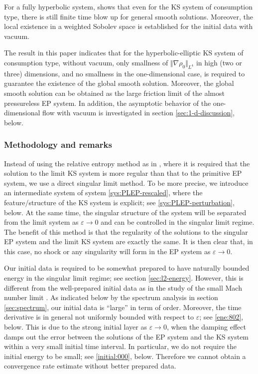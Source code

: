 \documentclass[11pt]{article}
\theoremstyle{plain}
\theoremstyle{definition}
\theoremstyle{remark}
\newcommand{\norm}[2]{\Vert #1 \Vert_{#2}}
\numberwithin{equation}{section}
\begin{document}
    For a fully hyperbolic system, \cite{jeongWellPosednessSingularityFormation2022} shows that even for the KS system of consumption type, there is still finite time blow up for general smooth solutions. Moreover, the local existence in a weighted Sobolev space is established for the initial data with vacuum. 

    The result in this paper indicates that for the hyperbolic-elliptic KS system of consumption type, without vacuum, only smallness of $ \norm{\nabla \rho_0}{L^4} $ in high (two or three) dimensions, and no smallness in the one-dimensional case, is required to guarantee the existence of the global smooth solution. Moreover, the global smooth solution can be obtained as the large friction limit of the almost pressureless EP system. In addition, the asymptotic behavior of the one-dimensional flow with vacuum is investigated in section \ref{sec:1-d-discussion}, below.




    \subsubsection*{Methodology and remarks}

    Instead of using the relative entropy method as in \cite{gallenmullerCahnHillardKeller2024}, where it is required that the solution to the limit KS system is more regular than that to the primitive EP system, we use a direct singular limit method. To be more precise, we introduce an intermediate system of system \eqref{sys:PLEP-rescaled}, where the feature/structure of the KS system is explicit; see \eqref{sys:PLEP-perturbation}, below. At the same time, the singular structure of the system will be separated from the limit system as $ \varepsilon \rightarrow 0 $ and can be controlled in the singular limit regime. The benefit of this method is that the regularity of the solutions to the singular EP system and the limit KS system are exactly the same. It is then clear that, in this case, no shock or any singularity will form in the EP system as $ \varepsilon \rightarrow 0 $. 

    Our initial data is required to be somewhat prepared to have naturally bounded energy in the singular limit regime; see section \ref{sec:l2-energy}. However, this is different from the well-prepared initial data as in the study of the small Mach number limit \cite{Klainerman1982}. As indicated below by the spectrum analysis in section \ref{sec:spectrum}, our initial data is ``large'' in term of order. Moreover, the time derivative is in general not uniformly bounded with respect to $ \varepsilon $; see \eqref{ene:802}, below. This is due to the strong initial layer as $ \varepsilon \rightarrow 0 $, when the damping effect damps out the error between the solutions of the EP system and the KS system within a very small initial time interval. In particular, we do not require the initial energy to be small; see \eqref{initial:000}, below. Therefore we cannot obtain a convergence rate estimate without better prepared data. 
\end{document}
